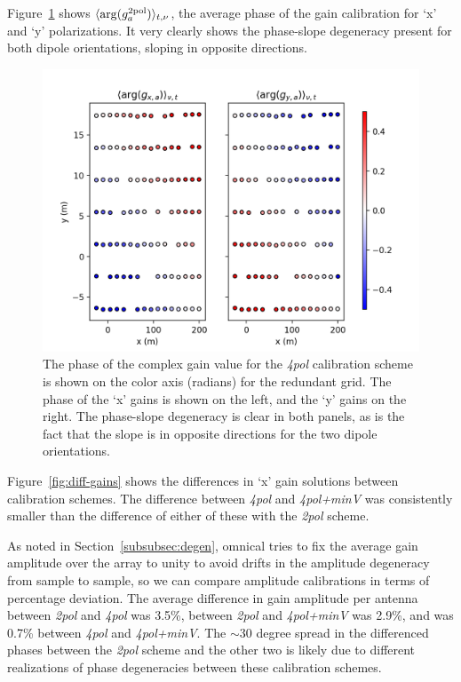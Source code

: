 Figure~\ref{fig:4pol-geo-angle} shows $\langle {\rm arg}( g^{\rm 2pol}_{a} ) \rangle_{t,\nu}$, the average phase of the gain calibration for `x' and `y' polarizations. It very clearly shows the phase-slope degeneracy present for both dipole orientations, sloping in opposite directions. 

\begin{figure}
\centering
\includegraphics[scale=0.5]{chapters/polcal/figures/4pol_geo.png}
\caption[The phase of the complex gain value for the \textit{4pol} calibration scheme.]{The phase of the complex gain value for the \textit{4pol} calibration scheme is shown on the color axis (radians) for the redundant grid. The phase of the `x' gains is shown on the left, and the `y' gains on the right. The phase-slope degeneracy is clear in both panels, as is the fact that the slope is in opposite directions for the two dipole orientations.}
\label{fig:4pol-geo-angle}
\end{figure}

Figure~\ref{fig:diff-gains} shows the differences in `x' gain solutions between calibration schemes. 
The difference between \textit{4pol} and \textit{4pol+minV} was consistently smaller than the difference of either of these with the \textit{2pol} scheme. 

As noted in Section~\ref{subsubsec:degen}, {\sc omnical} tries to fix the average gain amplitude over the array to unity to avoid drifts in the amplitude degeneracy from sample to sample, so we can compare amplitude calibrations in terms of percentage deviation. The average difference in gain amplitude per antenna between \textit{2pol} and \textit{4pol} was 3.5\%, between \textit{2pol} and \textit{4pol+minV} was 2.9\%, and was 0.7\% between \textit{4pol} and \textit{4pol+minV}. The $\sim$30 degree spread in the differenced phases between the \textit{2pol} scheme and the other two is likely due to different realizations of phase degeneracies between these calibration schemes.

